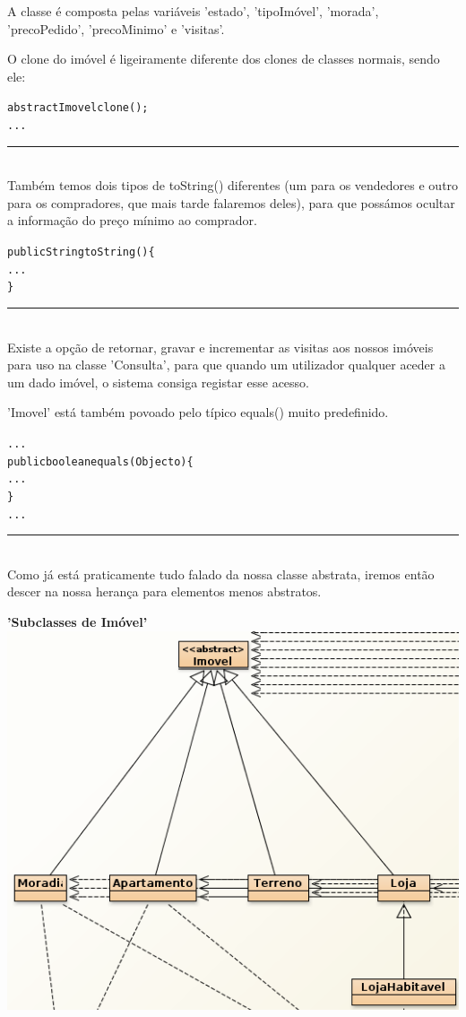 \documentclass[12pt]{article}
\newenvironment{code}                    
{\textbf{
} \hspace{1cm} \hrulefill \\ 
\smallskip 
\begin{center}
\begin{minipage}{0.9\textwidth} 
\begin{alltt}\small}
{\end{alltt}
\end{minipage}
\end{center}
\hrule\smallskip
}
\begin{document}
A classe é composta pelas variáveis 'estado', 'tipoImóvel', 'morada', 'precoPedido', 'precoMinimo' e 'visitas'. 
\newline

O clone do imóvel é ligeiramente diferente dos clones de classes normais, sendo ele:
\newline
\begin{code}
 abstract Imovel clone();
...
\end{code}
~\\

Também temos dois tipos de toString() diferentes (um para os vendedores e outro para os compradores, que mais tarde falaremos deles), para que possámos ocultar a informação do preço mínimo ao comprador.
\newline
\begin{code}
public String toString()\{
...
\}
\end{code}
~\\

Existe a opção de retornar, gravar e incrementar as visitas aos nossos imóveis para uso na classe 'Consulta', para que quando um utilizador qualquer aceder a um dado imóvel, o sistema consiga registar esse acesso.
\newline

'Imovel' está também povoado pelo típico equals() muito predefinido.
\newline
\begin{code}
...
public boolean equals(Object o)\{
...
\}
...
\end{code}
~\\

Como já está praticamente tudo falado da nossa classe abstrata, iremos então descer na nossa herança para elementos menos abstratos.
\pagebreak

\textbf{'Subclasses de Imóvel'}
\newline
\newline
\includegraphics[scale=0.5]{003.png}	
\newline
\end{document}
